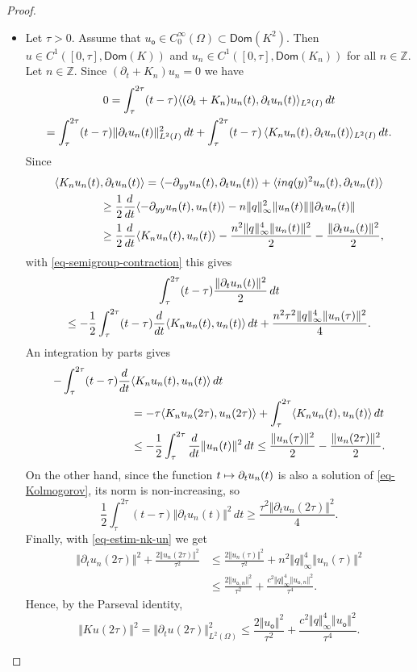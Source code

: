 \documentclass[11pt]{article}
\numberwithin{equation}{section}
\def\mto{\mathchoice{\longmapsto}{\mapsto}{\mapsto}{\mapsto}}
\theoremstyle{plain}
\theoremstyle{definition}
\newcommand{\nr}[1]{\Vert #1\Vert}
\newcommand{\1}{\mathds 1}
\let\Re\relax
\DeclareMathOperator{\Re}{\mathsf{Re}\mkern2mu}
\newcommand{\Dom}{\mathsf{Dom}}
\newcommand{\Z}{\mathbb{Z}}
\let\O\Omega
\newcommand{\uo}{u_{\mathsf{o}}}
\newcommand{\uon}{u_{\mathsf{o},n}}
\begin{document}
\begin{proof}
\begin{itemize}
\item
Let $\tau > 0$. Assume that $\uo \in C_0^\infty(\O) \subset \Dom(K^2)$. Then $u \in C^1([0,\tau], \Dom(K))$ and $u_n \in C^1([0,\tau], \Dom(K_n))$ for all $n \in \Z$. Let $n \in \Z$. Since $(\partial_t + K_n) u_n = 0$ we have
\begin{multline*}
0 = \Re \int_\tau^{2\tau} (t-\tau) \innp{(\partial_t + K_n) u_n(t)}{\partial_t u_n(t)}_{L^2(I)} \, dt\\
= \int_\tau^{2\tau} (t-\tau) \nr{\partial_t u_n(t)}_{L^2(I)}^2 \, dt + \int_\tau^{2\tau} (t-\tau) \, \Re \innp{K_n u_n(t)}{\partial_t u_n(t)}_{L^2(I)} \, dt.
\end{multline*}
Since
\begin{align*}
\Re \langle K_n u_n(t)&,\partial_t u_n(t)\rangle = \Re \innp{-\partial_{yy} u_n(t)}{\partial_t u_n(t)} + \Re \innp{inq(y)^2 u_n(t)}{\partial_t u_n(t)}\\
& \geq \frac 12 \frac d {dt} \innp{-\partial_{yy} u_n(t)}{u_n(t)} - n \nr{q}_\infty^2 \nr{u_n(t)} \nr{\partial_t u_n(t)}\\
& \geq \frac 12 \frac d {dt} \Re \innp{K_n u_n(t)}{u_n(t)} - \frac {n^2 \nr{q}_\infty^4 \nr{u_n(t)}^2}2 - \frac {\nr{\partial_t u_n(t)}^2} 2,
\end{align*}
with \eqref{eq-semigroup-contraction} this gives
\begin{multline*}
\int_{\tau}^{2\tau} (t-\tau) \frac {\nr{\partial_t u_n(t)}^2} 2 \, dt\\
\leq - \frac 12 \Re \int_{\tau}^{2\tau} (t-\tau) \frac d {dt} \innp{K_n u_n(t)}{u_n(t)} \, dt + \frac {n^2 \tau^2 \nr{q}_\infty^4 \nr{u_n(\tau)}^2} 4.
\end{multline*}
An integration by parts gives
\begin{align*}
- \Re \int_\tau^{2\tau} (t-\tau) \frac d {dt}& \innp{K_n u_n(t)}{u_n(t)} \, dt\\
& = - \tau \Re \innp{K_n u_n(2\tau)}{u_n(2\tau)} + \int_\tau^{2\tau} \Re \innp{K_n u_n(t)}{u_n(t)} \, dt\\
& \leq - \frac 12 \int_\tau^{2\tau} \frac d {dt} \nr{u_n(t)}^2 \,dt \leq \frac {\nr{u_n(\tau)}^2} 2 - \frac {\nr{u_n(2\tau)}^2} 2.
\end{align*}
On the other hand, since the function $t \mto \partial_t u_n(t)$ is also a solution of \eqref{eq-Kolmogorov}, its norm is non-increasing, so
\[
\frac 12 \int_\tau^{2\tau} (t-\tau) \nr{\partial_t u_n(t)}^2 \, dt \geq \frac {\tau^2 \nr{\partial_t u_n(2 \tau)}^2} 4.
\]
Finally, with \eqref{eq-estim-nk-un} we get
\begin{align*}
\nr{\partial_t u_n(2 \tau)}^2 + \frac {2 \nr{u_n(2\tau)}^2}{\tau^2}
& \leq \frac {2 \nr{u_n(\tau)}^2}{\tau^2} + n^2 \nr{q}_\infty^4 \nr{u_n(\tau)}^2 \\
& \leq \frac {2 \nr{\uon}^2}{\tau^2} + \frac {c^2 \nr{q}_\infty^4 \nr{\uon}^2}{\tau^4}.
\end{align*}
Hence, by the Parseval identity,
\begin{equation} \label{eq-Ku-tau}
\nr{Ku(2\tau)}^2 = \nr{\partial_t u(2\tau)}_{L^2(\O)}^2 \leq \frac {2 \nr{\uo}^2}{\tau^2} + \frac {c^2 \nr{q}_\infty^4 \nr{\uo}^2}{\tau^4}.
\end{equation}


\end{itemize}
\end{proof}
\end{document}
